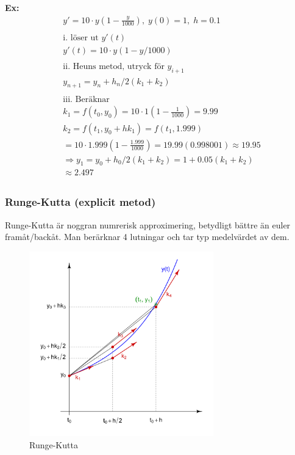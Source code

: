 \begin{multicols}{2}
\textbf{Ex:}
\begin{align*}
    &y'=10\cdot{y}(1-\frac{y}{1000}), \; y(0)=1, \; h=0.1 \\
    &\\
    &\text{i. löser ut } y'(t) \\
    &y'(t) = 10\cdot{y}(1-y/1000) \\
    &\\
    &\text{ii. Heuns metod, utryck för } y_{i+1} \\
    &y_{n+1} = y_n+h_n/2(k_1+k_2) \\
    &\\
    &\text{iii. Beräknar } \\
    &k_1 = f(t_0,y_0) = 10\cdot{1}(1-\frac{1}{1000}) = 9.99 \\
    &k_2 = f(t_1,y_0+hk_1) = f(t_1,1.999) \\
    &= 10\cdot{1.999}(1-\frac{1.999}{1000}) = 19.99(0.998001) \approx 19.95 \\
    &\Rightarrow y_1 = y_0 + h_0/2(k_1+k_2) = 1+0.05(k_1+k_2) \\
    &\approx 2.497 \\
\end{align*}


\subsubsection{Runge-Kutta (explicit metod)}
Runge-Kutta är noggran numrerisk approximering, betydligt bättre än 
euler framåt/backåt. Man berärknar 4 lutningar och tar typ medelvärdet av dem.
\begin{figure}[H]
    \centering
    \includegraphics[width=8cm]{image/Runge-Kutta_slopes.png}
    \caption{Runge-Kutta}
\end{figure}


\end{multicols}
